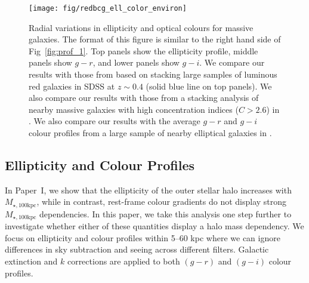 \documentclass[a4paper,fleqn,usenatbib]{mnras}
\def\mtot{{$M_{\star,100\mathrm{kpc}}$}}
\begin{document}

  \begin{figure}
      \centering 
      \texttt{[image: fig/redbcg\_ell\_color\_environ]}
      \caption{
          Radial variations in ellipticity and optical colours for massive galaxies. 
          The format of this figure is similar to the right hand side of 
          Fig~\ref{fig:prof_1}. 
          Top panels show the ellipticity profile, middle panels show $g-r$, and lower 
          panels show $g-i$. 
          We compare our results with those from \citet{Tal2011} based on stacking 
          large samples of luminous red galaxies in SDSS at $z{\sim} 0.4$ 
          (solid blue line on top panels). 
          We also compare our results with those from a stacking analysis of nearby 
          massive galaxies with high concentration indices ($C>2.6$) in 
          \citet[][blue dashed lines on the top and middle panels]{DSouza2014}. 
          We also compare our results with the average $g-r$ and $g-i$ colour profiles 
          from a large sample of nearby elliptical galaxies in \citet[][blue, solid 
          lines on the middle and bottom panels]{LaBarbera2010}.
          }
      \label{fig:ell_color}
  \end{figure}


\subsection{Ellipticity and Colour Profiles}
    \label{ssec:ell_color}
    
    In Paper~I, we show that the ellipticity of the outer stellar halo increases with
    \mtot{}, while in contrast, rest-frame colour gradients do not display strong 
    \mtot{} dependencies. 
    In this paper, we take this analysis one step further to investigate whether either 
    of these quantities display a halo mass dependency. 
    We focus on ellipticity and colour profiles within 5--60 kpc where we can ignore
    differences in sky subtraction and seeing across different filters. 
    Galactic extinction and $k$ corrections are applied to both $(g-r)$ and $(g-i)$ 
    colour profiles.
    
\end{document}
